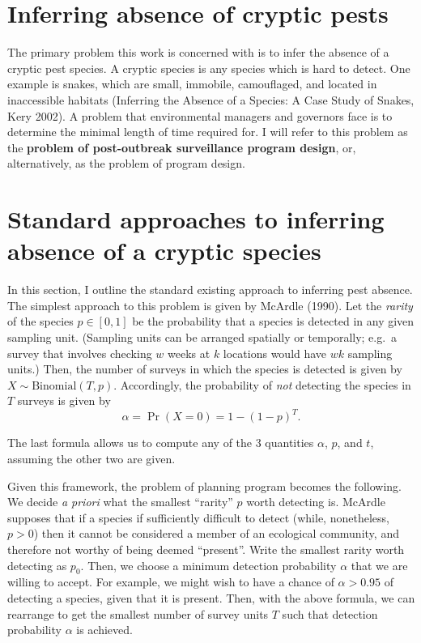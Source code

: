 \documentclass[
]{book}
\begin{document}
\hypertarget{inferring-absence-of-cryptic-pests}{%
\section{Inferring absence of cryptic pests}\label{inferring-absence-of-cryptic-pests}}

The primary problem this work is concerned with is to infer the absence of a cryptic pest species. A cryptic species is any species which is hard to detect. One example is snakes, which are small, immobile, camouflaged, and located in inaccessible habitats (Inferring the Absence of a Species: A Case Study of Snakes, Kery 2002). A problem that environmental managers and governors face is to determine the minimal length of time required for. I will refer to this problem as the \textbf{problem of post-outbreak surveillance program design}, or, alternatively, as the problem of program design.

\hypertarget{standard-approaches-to-inferring-absence-of-a-cryptic-species}{%
\section{Standard approaches to inferring absence of a cryptic species}\label{standard-approaches-to-inferring-absence-of-a-cryptic-species}}

In this section, I outline the standard existing approach to inferring pest absence. The simplest approach to this problem is given by McArdle (1990). Let the \emph{rarity} of the species \(p \in [0, 1]\) be the probability that a species is detected in any given sampling unit. (Sampling units can be arranged spatially or temporally; e.g.~a survey that involves checking \(w\) weeks at \(k\) locations would have \(wk\) sampling units.) Then, the number of surveys in which the species is detected is given by \(X \sim \mathrm{Binomial}(T, p)\). Accordingly, the probability of \emph{not} detecting the species in \(T\) surveys is given by
\[
\alpha = \Pr(X = 0) = 1 - (1 - p)^T.
\]

The last formula allows us to compute any of the 3 quantities \(\alpha\), \(p\), and \(t\), assuming the other two are given.

Given this framework, the problem of planning program becomes the following. We decide \emph{a priori} what the smallest ``rarity'' \(p\) worth detecting is. McArdle supposes that if a species if sufficiently difficult to detect (while, nonetheless, \(p > 0\)) then it cannot be considered a member of an ecological community, and therefore not worthy of being deemed ``present''. Write the smallest rarity worth detecting as \(p_0\). Then, we choose a minimum detection probability \(\alpha\) that we are willing to accept. For example, we might wish to have a chance of \(\alpha > 0.95\) of detecting a species, given that it is present. Then, with the above formula, we can rearrange to get the smallest number of survey units \(T\) such that detection probability \(\alpha\) is achieved.
\end{document}
